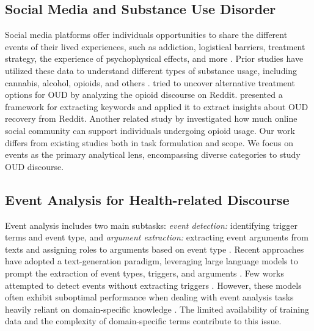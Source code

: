 \documentclass[letterpaper]{article} %
\begin{document}
\subsection{Social Media and Substance Use Disorder}
Social media platforms offer individuals opportunities to share the different events of their lived experiences, such as addiction, logistical barriers, treatment strategy, the experience of psychophysical effects, and more \cite{info:doi/10.2196/43349}. Prior studies have utilized these data to understand different types of substance usage, including cannabis, alcohol, opioids, and others \cite{Lavertu2021.04.01.21254815, CHEN2022100061}. \citeauthor{OpioidRecovery}  tried to uncover alternative treatment options for OUD by analyzing the opioid discourse on Reddit. \citeauthor{romano2023themedriven}  presented a framework for extracting keywords and applied it to extract insights about OUD recovery from Reddit. Another related study by   \citeauthor{Balsamo_Bajardi_De}  investigated how much online social community can support individuals undergoing opioid usage. Our work differs from existing studies both in task formulation and scope. We focus on events as the primary analytical lens, encompassing diverse categories to study OUD discourse.

\subsection{Event Analysis for Health-related Discourse}
Event analysis includes two main subtasks: \textit{event detection:} identifying trigger terms and event type, and \textit{argument extraction:} extracting event arguments from texts and assigning roles to arguments based on event type \cite{ma-etal-2023-dice}. %
 Recent approaches have adopted a text-generation paradigm, leveraging large language models to prompt the extraction of event types, triggers, and arguments \cite{li-etal-2021-document,lu-etal-2021-text2event}. Few works attempted to detect events without extracting triggers \cite{liu-etal-2019-event}. However, these models often exhibit suboptimal performance when dealing with event analysis tasks heavily reliant on domain-specific knowledge \cite{li2023evaluating}. The limited availability of training data and the complexity of domain-specific terms contribute to this issue. 
\end{document}

